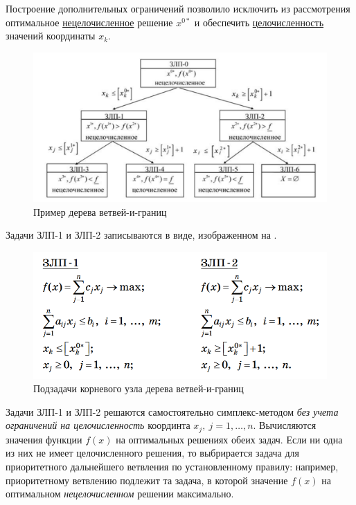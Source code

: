 \documentclass[%
	11pt,
	a4paper,
	utf8,
		]{article}
\begin{document}
Построение дополнительных ограничений позволило исключить из рассмотрения оптимальное \underline{нецелочисленное} решение $ x^{0*} $ и обеспечить \underline{целочисленность} значений координаты $ x_k $.

\begin{figure}[h]
	\centering
	\includegraphics[scale=0.7]{figures/bb_tree.png}
	\caption{ Пример дерева ветвей-и-границ }\label{fig:bb_tree}
\end{figure}

Задачи ЗЛП-1 и ЗЛП-2 записываются в виде, изображенном на .

\begin{figure}[h]
	\centering
	\includegraphics[scale=0.6]{figures/zlp_1_and_zlp_2.png}
	\caption{ Подзадачи корневого узла дерева ветвей-и-границ }\label{fig:zlp_1_and_zlp_2}
\end{figure}

Задачи ЗЛП-1 и ЗЛП-2 решаются самостоятельно симплекс-методом \emph{без учета ограничений на целочисленность} координта $ x_j, \ j = 1, \ldots, n $. Вычисляются значения функции $ f(x) $ на оптимальных решениях обеих задач. Если ни одна из них не имеет целочисленного решения, то выбрирается задача для приоритетного дальнейшего ветвления по установленному правилу: например, приоритетному ветвлению подлежит та задача, в которой значение $ f(x) $ на оптимальном \emph{нецелочисленном} решении максимально.
\end{document}
